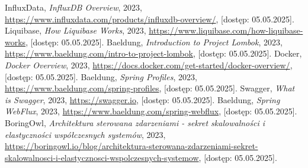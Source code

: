 \documentclass[a4paper,12pt,openany]{book}
\begin{document}
\begin{thebibliography}{99}
 InfluxData, \textit{InfluxDB Overview}, 2023, \url{https://www.influxdata.com/products/influxdb-overview/}, [dostęp: 05.05.2025].
 Liquibase, \textit{How Liquibase Works}, 2023, \url{https://www.liquibase.com/how-liquibase-works}, [dostęp: 05.05.2025].
 Baeldung, \textit{Introduction to Project Lombok}, 2023, \url{https://www.baeldung.com/intro-to-project-lombok}, [dostęp: 05.05.2025].
 Docker, \textit{Docker Overview}, 2023, \url{https://docs.docker.com/get-started/docker-overview/}, [dostęp: 05.05.2025].
 Baeldung, \textit{Spring Profiles}, 2023, \url{https://www.baeldung.com/spring-profiles}, [dostęp: 05.05.2025].
 Swagger, \textit{What is Swagger}, 2023, \url{https://swagger.io}, [dostęp: 05.05.2025].
 Baeldung, \textit{Spring WebFlux}, 2023, \url{https://www.baeldung.com/spring-webflux}, [dostęp: 05.05.2025].
 BoringOwl, \textit{Architektura sterowana zdarzeniami - sekret skalowalności i elastyczności współczesnych systemów}, 2023, \url{https://boringowl.io/blog/architektura-sterowana-zdarzeniami-sekret-skalowalnosci-i-elastycznosci-wspolczesnych-systemow}, [dostęp: 05.05.2025].
\end{thebibliography}
\end{document}
